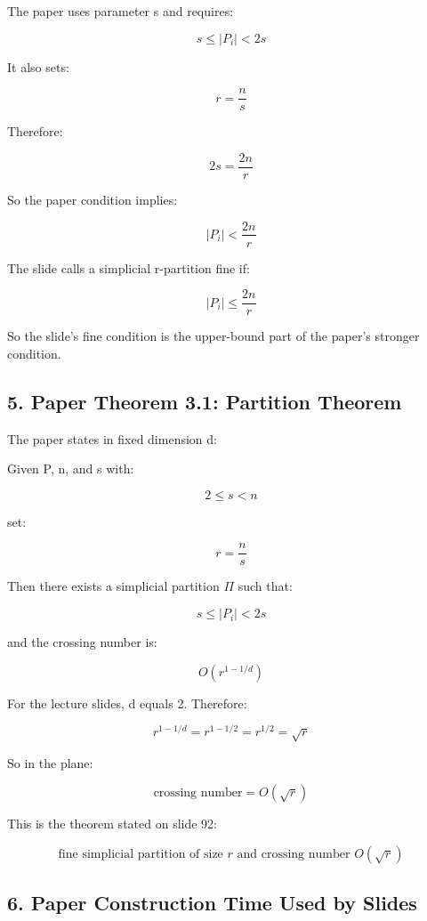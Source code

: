 \documentclass[
  11pt,
]{article}
\begin{document}
The paper uses parameter s and requires:

\[
s\le |P_i|<2s
\]

It also sets:

\[
r=\frac ns
\]

Therefore:

\[
2s=\frac{2n}{r}
\]

So the paper condition implies:

\[
|P_i|< \frac{2n}{r}
\]

The slide calls a simplicial r-partition fine if:

\[
|P_i|\le \frac{2n}{r}
\]

So the slide's fine condition is the upper-bound part of the paper's
stronger condition.

\hypertarget{paper-theorem-3.1-partition-theorem}{%
\subsection{5. Paper Theorem 3.1: Partition
Theorem}\label{paper-theorem-3.1-partition-theorem}}

The paper states in fixed dimension d:

Given P, n, and s with:

\[
2\le s< n
\]

set:

\[
r=\frac ns
\]

Then there exists a simplicial partition \(\Pi\) such that:

\[
s\le |P_i|<2s
\]

and the crossing number is:

\[
O(r^{1-1/d})
\]

For the lecture slides, d equals 2. Therefore:

\[
r^{1-1/d}=r^{1-1/2}=r^{1/2}=\sqrt r
\]

So in the plane:

\[
\text{crossing number}=O(\sqrt r)
\]

This is the theorem stated on slide 92:

\[
\text{fine simplicial partition of size }r \text{ and crossing number }O(\sqrt r)
\]

\hypertarget{paper-construction-time-used-by-slides}{%
\subsection{6. Paper Construction Time Used by
Slides}\label{paper-construction-time-used-by-slides}}
\end{document}
